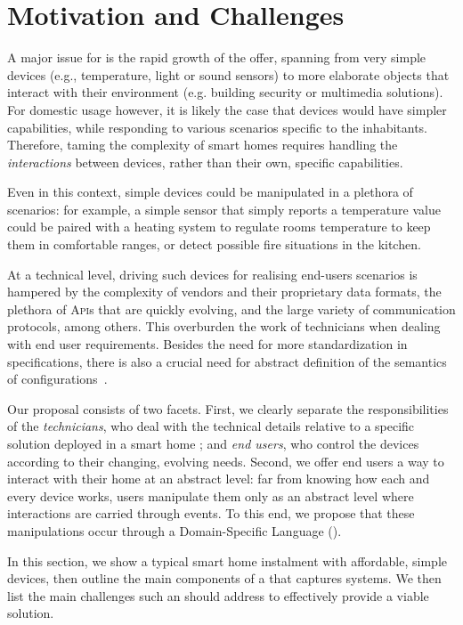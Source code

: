 \section{Motivation and Challenges}
\label{sec:Motivation}

A major issue for \IOT is the rapid growth of the offer, spanning from very simple devices (e.g., temperature, light or sound sensors) to more elaborate objects that interact with their environment (e.g. building security or multimedia solutions). For domestic usage however, it is likely the case that devices would have simpler capabilities, while responding to various scenarios specific to the inhabitants. Therefore, taming the complexity of smart homes requires handling the \emph{interactions} between devices, rather than their own, specific capabilities. 

Even in this context, simple devices could be manipulated in a plethora of scenarios: for example, a simple sensor that simply reports a temperature value could be paired with a heating system to regulate rooms temperature to keep them in comfortable ranges, or detect possible fire situations in the kitchen. 

At a technical level, driving such devices for realising end-users scenarios is hampered by the complexity of vendors and their proprietary data formats, the plethora of \textsc{Api}s that are quickly evolving, and the large variety of communication protocols, among others. This overburden the work of \IOT technicians when dealing with end user requirements. Besides the need for more standardization in \IOT specifications, there is also a crucial need for abstract definition of the semantics of \IOT configurations~\cite{park-16}.

Our proposal consists of two facets. First, we clearly separate the responsibilities of the \emph{technicians}, who deal with the technical details relative to a specific solution deployed in a smart home \cite{park-16}; and \emph{end users}, who control the devices according to their changing, evolving needs. Second, we offer end users a way to interact with their home at an abstract level: far from knowing how each and every device works, users manipulate them only as an abstract level where interactions are carried through events. To this end, we propose that these manipulations occur through a Domain-Specific Language (\DSL).

In this section, we show a typical smart home instalment with affordable, simple devices, then outline the main components of a \DSL that captures \IOT systems. We then list the main challenges such an \IOT \DSL should address to effectively provide a viable solution.

